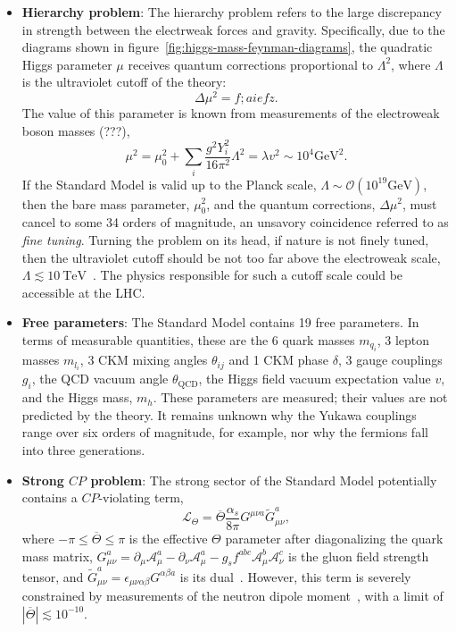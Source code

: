 \begin{itemize}
	\item \textbf{Hierarchy problem}: The hierarchy problem refers to the large discrepancy in strength between the electrweak forces and gravity. Specifically, due to the diagrams shown in figure~\ref{fig:higgs-mass-feynman-diagrams}, the quadratic Higgs parameter $\mu$ receives quantum corrections proportional to $\Lambda^2$, where $\Lambda$ is the ultraviolet cutoff of the theory:
	\begin{equation}
		\Delta\mu^2 = f;aiefz.
	\end{equation}
	The value of this parameter is known from measurements of the electroweak boson masses (???),
	\begin{equation}
		\mu^2 = \mu_0^2 + \sum_i \frac{g^2 Y_i^2}{16\pi^2}\Lambda^2 = \lambda v^2 \sim 10^4\mbox{GeV}^2. 
	\end{equation}
	If the Standard Model is valid up to the Planck scale, $\Lambda\sim \mathcal{O}(10^19\mbox{GeV})$, then the bare mass parameter, $\mu_0^2$, and the quantum corrections, $\Delta \mu^2$, must cancel to some 34 orders of magnitude, an unsavory coincidence referred to as \emph{fine tuning}. Turning the problem on its head, if nature is not finely tuned, then the ultraviolet cutoff should be not too far above the electroweak scale, $\Lambda \lesssim 10~\mbox{TeV}$~\cite{pinner}. The physics responsible for such a cutoff scale could be accessible at the LHC. 

	\item \textbf{Free parameters}: The Standard Model contains 19 free parameters. In terms of measurable quantities, these are the 6 quark masses $m_{q_i}$, 3 lepton masses $m_{l_i}$, 3 CKM mixing angles $\theta_{ij}$ and 1 CKM phase $\delta$, 3 gauge couplings $g_i$, the QCD vacuum angle $\theta_{\mathrm{QCD}}$, the Higgs field vacuum expectation value $v$, and the Higgs mass, $m_h$. These parameters are measured; their values are not predicted by the theory. It remains unknown why the Yukawa couplings range over six orders of magnitude, for example, nor why the fermions fall into three generations. 

	\item \textbf{Strong $CP$ problem}: The strong sector of the Standard Model potentially contains a $CP$-violating term, 
	\begin{equation}
		\mathcal{L}_{\Theta}=\overline{\Theta} \frac{\alpha_s}{8\pi}G^{\mu \nu a} \tilde{G}^{a}_{\mu\nu},
	\end{equation}
	where $-\pi\leq\overline{\Theta}\leq\pi$ is the effective $\Theta$ parameter after diagonalizing the quark mass matrix, $G^{a}_{\mu\nu}=\partial_{\mu}\mathcal{A}_{\mu}^{a}-\partial_{\nu}\mathcal{A}_{\mu}^{a} - g_s f^{abc}\mathcal{A}_{\mu}^{b} \mathcal{A}_{\nu}^{c}$ is the gluon field strength tensor, and $\tilde{G}^a_{\mu\nu}=\epsilon_{\mu\nu\alpha\beta}G^{\alpha\beta a}$ is its dual~\cite{pdg-axions}. However, this term is severely constrained by measurements of the neutron dipole moment~\cite{PhysRevLett.97.131801}, with a limit of $|\overline{\Theta}|\lesssim 10^{-10}$. 


\end{itemize}

